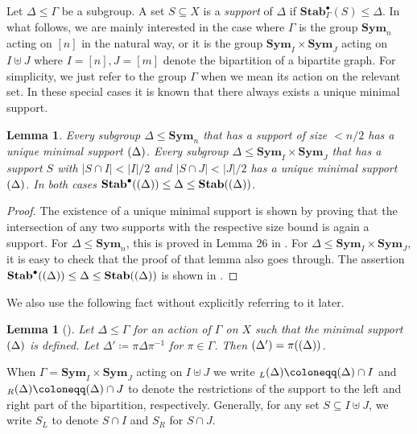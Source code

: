\documentclass[11pt, DIV=15]{scrarticle}
\theoremstyle{definition}
\theoremstyle{plain}
\newtheorem{lemma}[definition]{Lemma}
\theoremstyle{remark}
\newcommand{\Sym}{\mathbf{Sym}}
\newcommand{\Stab}{\mathbf{Stab}}
\newcommand{\StabP}{\Stab^{\bullet}}
\let\sup\relax
\DeclareMathOperator{\sup}{sup}
\begin{document}
Let $\Delta \leq \Gamma$ be a subgroup. A set $S \subseteq X$
is a \emph{support} of $\Delta$ if $\StabP_\Gamma(S) \leq
\Delta$.  In what follows, we are mainly interested in the
case where $\Gamma$ is the group $\Sym_n$ acting on $[n]$ in
the natural way, or it is the group $\Sym_I \times \Sym_J$
acting on $I \uplus J$ where $I = [n], J = [m]$ denote the bipartition of a bipartite graph.  For
simplicity, we just refer to the group $\Gamma$ when we mean
its action on the relevant set.  In these special cases it is known that there always exists a unique minimal support.
\begin{lemma}
	\label{lem:minSupportExists}
	Every subgroup $\Delta \leq \Sym_n$ that has a support of size $< n/2$ has a unique minimal support  $\sup(\Delta)$.
	Every subgroup $\Delta \leq \Sym_I \times \Sym_J$ that has a support $S$ with $|S \cap I| < |I|/2$ and $|S \cap J| < |J|/2$ has a unique minimal support $\sup(\Delta)$.
	In both cases $\StabP(\sup(\Delta)) \leq \Delta \leq \Stab(\sup(\Delta))$.
\end{lemma}	
\begin{proof}
	The existence of a unique minimal support is shown by proving that the intersection of any two supports with the respective size bound is again a support. For $\Delta \leq \Sym_n$, this is proved in Lemma 26 in \cite{blass1999choiceless}. 
	For $\Delta \leq \Sym_I \times \Sym_J$, it is easy to check that the proof of that lemma also goes through.
	The assertion $\StabP(\sup(\Delta)) \leq \Delta \leq \Stab(\sup(\Delta))$ is shown in \cite{anderson_symmetric_2017}.
\end{proof}	



We also use the following fact without explicitly referring to it later. 
\begin{lemma}[\cite{anderson_symmetric_2017}]
	\label{lem:groupActionOnSupports}
	Let $\Delta \leq \Gamma$ for an action of $\Gamma$ on $X$ such that the minimal support $\sup(\Delta)$ is defined. Let $\Delta' \coloneqq \pi \Delta \pi^{-1}$ for $\pi \in \Gamma$. Then $\sup(\Delta') = \pi(\sup(\Delta))$.
\end{lemma}	
When $\Gamma = \Sym_I \times \Sym_J$ acting on $I \uplus J$
we write $\sup_L(\Delta) \coloneqq \sup(\Delta) \cap I$ and
$\sup_R(\Delta) \coloneqq \sup(\Delta) \cap J$ to denote the
restrictions of the support to the left and right part of the
bipartition, respectively.  Generally, for any set $S \subseteq I \uplus J$, we write $S_L$ to denote $S \cap I$ and $S_R$ for $S \cap J$.
\end{document}
